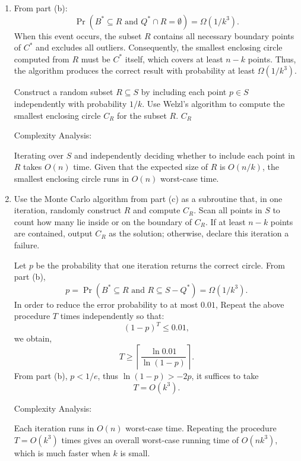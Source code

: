 \documentclass[11pt]{article}
\begin{document}
\begin{description}
\begin{enumerate}
  \item[(c)]
  From part (b):
  \[
  \Pr(B^* \subseteq R \text{ and } Q^* \cap R = \emptyset) = \Omega(1/k^3).
  \]
  When this event occurs, 
  the subset $R$ contains all necessary boundary points of $C^*$ 
  and excludes all outliers. 
  Consequently, the smallest enclosing circle computed from 
  $R$ must be $C^*$ itself, which covers at least $n-k$ points. 
  Thus, the algorithm produces the correct result 
  with probability at least $\Omega(1/k^3)$.
  \begin{algorithm}
  \caption{}
  \begin{algorithmic}[1]
    \State Construct a random subset $R \subseteq S$ by including 
    each point $p \in S$ independently with probability $1/k$. 
    \State Use Welzl's algorithm to compute the smallest enclosing circle 
    $C_R$ for the subset $R$.
    \State \Return $C_R$
  \end{algorithmic}
  \end{algorithm}

  Complexity Analysis:

  Iterating over $S$ and independently deciding whether to 
  include each point in $R$ takes $O(n)$ time. 
  Given that the expected size of $R$ is $O(n/k)$, 
  the smallest enclosing circle runs in $O(n)$ worst-case time.

  \item[(d)]
    Use the Monte Carlo algorithm from part (c) as a subroutine that, 
    in one iteration, randomly construct $R$ and compute $C_R$.
    Scan all points in $S$ to count how many lie inside or on the boundary of $C_R$. 
    If at least $n-k$ points are contained, output $C_R$ as the solution; 
    otherwise, declare this iteration a failure.
    
    Let $p$ be the probability that one iteration returns the correct circle. From part (b), 
    \[
    p = \Pr(B^* \subseteq R \text{ and } R\subseteq S-Q^*) = \Omega(1/k^3).
    \]
    In order to reduce the error probability to at most $0.01$, 
    Repeat the above procedure $T$ times independently so that:
    \[
    (1-p)^T \le 0.01,
    \]
    we obtain,
    \[
    T \ge \left\lceil \frac{\ln 0.01}{\ln (1-p)} \right\rceil.
    \]
    From part (b), $p < 1/e$, thus $\ln(1-p) > -2p$, it suffices to take
    \[
    T = O\left(k^3\right).
    \]

    Complexity Analysis:

    Each iteration runs in $O(n)$ worst-case time. 
    Repeating the procedure $T = O(k^3)$ times gives 
    an overall worst-case running time of $O(nk^3)$, 
    which is much faster when $k$ is small.


\end{enumerate}
\end{description}
\end{document}
